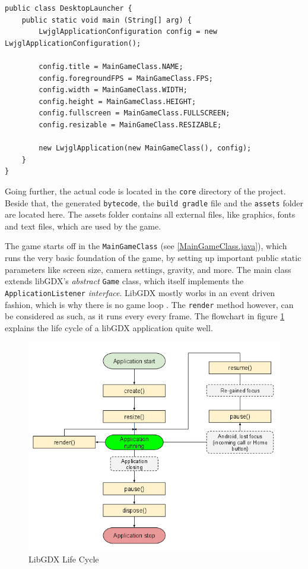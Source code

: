 \documentclass[12p]{article}
\begin{document}
\begin{verbatim}
public class DesktopLauncher {
	public static void main (String[] arg) {
		LwjglApplicationConfiguration config = new LwjglApplicationConfiguration();

		config.title = MainGameClass.NAME;
		config.foregroundFPS = MainGameClass.FPS;
		config.width = MainGameClass.WIDTH;
		config.height = MainGameClass.HEIGHT;
		config.fullscreen = MainGameClass.FULLSCREEN;
		config.resizable = MainGameClass.RESIZABLE;

		new LwjglApplication(new MainGameClass(), config);
	}
}
\end{verbatim}

Going further, the actual code is located in the \texttt{core} directory of the project. Beside that, the generated \texttt{bytecode}, the \texttt{build gradle} file and the \texttt{assets} folder are located here. The assets folder contains all external files, like graphics, fonts and text files, which are used by the game.

The game starts off in the \texttt{MainGameClass} (see \ref{MainGameClass.java}), which runs the very basic foundation of the game, by setting up important public static parameters like screen size, camera settings, gravity, and more. The main class extends libGDX's \emph{abstract} \texttt{Game} class, which itself implements the \texttt{ApplicationListener} \emph{interface}. LibGDX mostly works in an event driven fashion, which is why there is no game loop \cite{libGDXLifeCycle}. The \texttt{render} method however, can be considered as such, as it runs every every frame. The flowchart in figure \ref{fig:LibGDXLifeCycle} explains the life cycle of a libGDX application quite well.

\begin{figure}[ht]
    \center
    \includegraphics[width=1\textwidth]{Documentation/lifeCycle}
    \caption{LibGDX Life Cycle \cite{libGDXLifeCycle}}
    \label{fig:LibGDXLifeCycle}
\end{figure}
\end{document}
